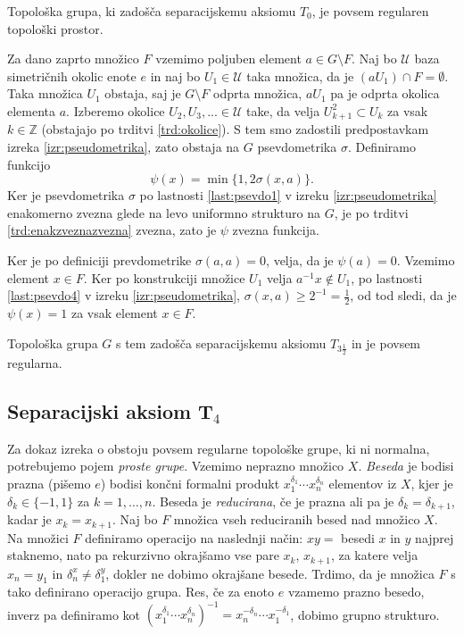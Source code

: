 \documentclass[mat1]{fmfdelo}
\newcommand{\Z}{\mathbb Z}
\newcommand{\Ucurl}{\mathcal{U}}
\begin{document}
\begin{izrek}\label{izr:t3pol}
	Topološka grupa, ki zadošča separacijskemu aksiomu $T_0$, je povsem regularen topološki prostor.
\end{izrek}

\begin{dokaz}
Za dano zaprto množico $F$ vzemimo poljuben element $a \in G\setminus F$.
Naj bo $\Ucurl$ baza simetričnih okolic enote $e$ in naj bo $U_1 \in \Ucurl$ taka množica, da je $(aU_1)\cap F = \emptyset$. Taka množica $U_1$ obstaja, saj je $G\setminus F$ odprta množica, $aU_1$ pa je odprta okolica elementa $a$. Izberemo okolice $U_2, U_3,... \in \Ucurl$ take, da velja $U_{k+1}^2 \subset U_k$ za vsak $k \in \Z$ (obstajajo po trditvi \ref{trd:okolice}). S tem smo zadostili predpostavkam izreka \ref{izr:pseudometrika}, zato obstaja na $G$ psevdometrika $\sigma$. Definiramo funkcijo \[ \psi(x) = \min\lbrace 1, 2\sigma(x, a)\rbrace. \] Ker je psevdometrika $\sigma$ po lastnosti \ref{last:psevdo1} v izreku \ref{izr:pseudometrika} enakomerno zvezna glede na levo uniformno strukturo na $G$, je po trditvi \ref{trd:enakzveznazvezna} zvezna, zato je $\psi$ zvezna funkcija.

Ker je po definiciji prevdometrike $\sigma(a, a) = 0$, velja, da je $\psi(a) = 0$.
Vzemimo element $x \in F$. Ker po konstrukciji množice $U_1$ velja $a^{-1}x \notin U_1$, po lastnosti \ref{last:psevdo4} v izreku \ref{izr:pseudometrika}, $\sigma(x, a) \geq 2^{-1} = \frac{1}{2}$, od tod sledi, da je $\psi(x) = 1$ za vsak element $x \in F$.

Topološka grupa $G$ s tem zadošča separacijskemu aksiomu $T_{3\frac{1}{2}}$ in je povsem regularna.
\end{dokaz}

\subsection{Separacijski aksiom T$_4$}
Za dokaz izreka o obstoju povsem regularne topološke grupe, ki ni normalna, potrebujemo pojem \emph{proste grupe}. Vzemimo neprazno množico $X$. \emph{Beseda} je bodisi prazna (pišemo $e$) bodisi končni formalni produkt $x_1^{\delta_1}\cdots x_n^{\delta_n}$ elementov iz $X$, kjer je $\delta_k \in \lbrace -1, 1\rbrace$ za $k = 1,\dots,n$. Beseda je \emph{reducirana}, če je prazna ali pa je $\delta_k = \delta_{k+1}$, kadar je $x_k = x_{k+1}$. Naj bo $F$ množica vseh reduciranih besed nad množico $X$. Na množici $F$ definiramo operacijo na naslednji način: $xy = $ besedi $x$ in $y$ najprej staknemo, nato pa rekurzivno okrajšamo vse pare $x_k$, $x_{k+1}$, za katere velja $x_n = y_1$ in $\delta_n^x \neq \delta_1^y$, dokler ne dobimo okrajšane besede. Trdimo, da je množica $F$ s tako definirano operacijo grupa. Res, če za enoto $e$ vzamemo prazno besedo, inverz pa definiramo kot $(x_1^{\delta_1}\cdots x_n^{\delta_n})^{-1} = x_n^{-\delta_n}\cdots x_1^{-\delta_1}$, dobimo grupno strukturo.
\end{document}
